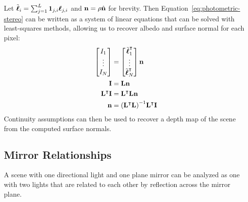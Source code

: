 Let $\tilde{\boldsymbol{\ell}}_i = \sum_{j = 1}^L \mathbf{1}_{j, i} \boldsymbol{\ell}_{j, i}$ and
$\mathbf{n} = \rho \hat{\mathbf{n}}$ for brevity. Then
Equation~\ref{eq:photometric-stereo} can be written as a system of linear
equations that can be solved with least-squares methods, allowing us to recover
albedo and surface normal for each pixel:
\begin{align}
  \begin{bmatrix}
    I_1 \\
    \vdots \\
    I_N
  \end{bmatrix}             &= \begin{bmatrix}
    \tilde{\boldsymbol{\ell}}_1^\intercal \\
    \vdots \\
    \tilde{\boldsymbol{\ell}}_N^\intercal
  \end{bmatrix} \mathbf{n} \\
  \mathbf{I}                   &= \mathbf{L} \mathbf{n} \\
  \mathbf{L}^\intercal \mathbf{I} &= \mathbf{L}^\intercal \mathbf{L} \mathbf{n} \\
  \mathbf{n}                    &= {\left(\mathbf{L}^\intercal \mathbf{L}\right)}^{-1} \mathbf{L}^\intercal \mathbf{I}
\end{align}
Continuity assumptions can then be used to recover a depth map of the scene
from the computed surface normals.
\subsection{Mirror Relationships}
A scene with one directional light and one plane mirror can be analyzed as one
with two lights that are related to each other by reflection across the mirror
plane.

